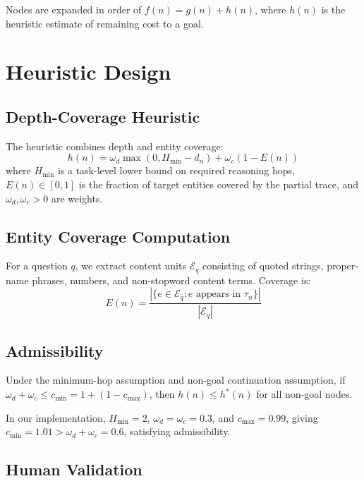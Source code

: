 Nodes are expanded in order of $f(n) = g(n) + h(n)$, where $h(n)$ is the heuristic estimate of remaining cost to a goal.

\section{Heuristic Design}

\subsection{Depth-Coverage Heuristic}

The heuristic combines depth and entity coverage:
\begin{equation}
h(n) = \omega_d \max(0, H_{\min} - d_n) + \omega_c(1 - E(n))
\end{equation}
where $H_{\min}$ is a task-level lower bound on required reasoning hops, $E(n) \in [0,1]$ is the fraction of target entities covered by the partial trace, and $\omega_d, \omega_c > 0$ are weights.

\subsection{Entity Coverage Computation}

For a question $q$, we extract content units $\mathcal{E}_q$ consisting of quoted strings, proper-name phrases, numbers, and non-stopword content terms. Coverage is:
\begin{equation}
E(n) = \frac{|\{e \in \mathcal{E}_q : e \text{ appears in } \tau_n\}|}{|\mathcal{E}_q|}
\end{equation}

\subsection{Admissibility}

\begin{theorem}
Under the minimum-hop assumption and non-goal continuation assumption, if $\omega_d + \omega_c \leq c_{\min} = 1 + (1 - c_{\max})$, then $h(n) \leq h^*(n)$ for all non-goal nodes.
\end{theorem}

In our implementation, $H_{\min} = 2$, $\omega_d = \omega_c = 0.3$, and $c_{\max} = 0.99$, giving $c_{\min} = 1.01 > \omega_d + \omega_c = 0.6$, satisfying admissibility.

\subsection{Human Validation}

